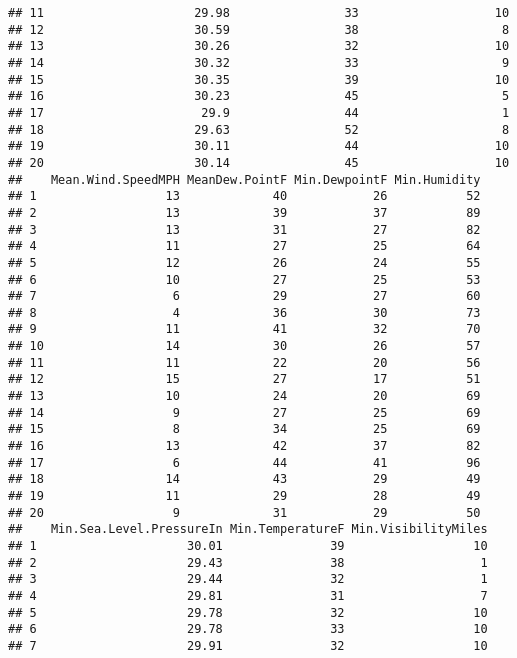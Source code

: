 \documentclass[]{article}
\begin{document}
\begin{verbatim}
## 11                     29.98                33                   10
## 12                     30.59                38                    8
## 13                     30.26                32                   10
## 14                     30.32                33                    9
## 15                     30.35                39                   10
## 16                     30.23                45                    5
## 17                      29.9                44                    1
## 18                     29.63                52                    8
## 19                     30.11                44                   10
## 20                     30.14                45                   10
##    Mean.Wind.SpeedMPH MeanDew.PointF Min.DewpointF Min.Humidity
## 1                  13             40            26           52
## 2                  13             39            37           89
## 3                  13             31            27           82
## 4                  11             27            25           64
## 5                  12             26            24           55
## 6                  10             27            25           53
## 7                   6             29            27           60
## 8                   4             36            30           73
## 9                  11             41            32           70
## 10                 14             30            26           57
## 11                 11             22            20           56
## 12                 15             27            17           51
## 13                 10             24            20           69
## 14                  9             27            25           69
## 15                  8             34            25           69
## 16                 13             42            37           82
## 17                  6             44            41           96
## 18                 14             43            29           49
## 19                 11             29            28           49
## 20                  9             31            29           50
##    Min.Sea.Level.PressureIn Min.TemperatureF Min.VisibilityMiles
## 1                     30.01               39                  10
## 2                     29.43               38                   1
## 3                     29.44               32                   1
## 4                     29.81               31                   7
## 5                     29.78               32                  10
## 6                     29.78               33                  10
## 7                     29.91               32                  10

\end{verbatim}
\end{document}
